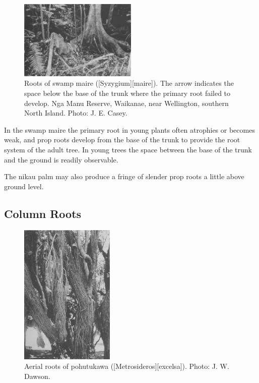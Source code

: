 \begin{figure}
	\includegraphics[width=0.5\textwidth]{graphics/figure14swampmaire.jpg}
	\centering
	\caption[Roots of swamp maire]{Roots of swamp maire ([Syzygium][maire]).
	The arrow indicates the space below the base of the trunk where the primary root failed to develop.
	Nga Manu Reserve, Waikanae, near Wellington, southern North Island.
	Photo:  J. E. Casey.}%
	\label{fig:14swampmaire}
\end{figure}

In the swamp maire the primary root in young plants often atrophies or becomes weak, and prop roots develop from the base of the trunk to provide the root system of the adult tree.
In young trees the space between the base of the trunk and the ground is readily observable.

The nikau palm may also produce a fringe of slender prop roots a little above ground level.

\subsection{Column Roots}

\begin{figure}
	\includegraphics[width=0.4\textwidth]{graphics/figure15pohutakawa.jpg}
	\centering
	\caption[Aerial roots of pohutukawa]{Aerial roots of pohutukawa ([Metrosideros][excelsa]).
	Photo:  J. W. Dawson.}%
	\label{fig:15pohutakawa}
\end{figure}

